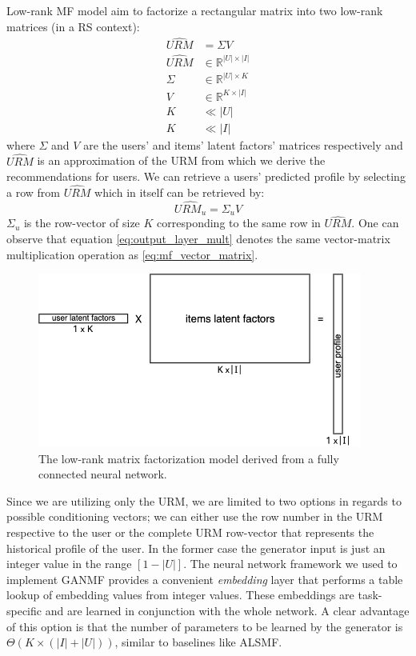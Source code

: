 Low-rank MF model aim to factorize a rectangular matrix into two low-rank matrices (in a RS context):
\[
\begin{split}
    \hat{URM} & = \Sigma V \\
    \hat{URM} & \in \mathbb{R}^{|U| \times |I|} \\
    \Sigma & \in \mathbb{R}^{|U| \times K} \\
    V & \in \mathbb{R}^{K \times |I|} \\
    K & \ll |U| \\
    K & \ll |I|
\end{split}
\]
where $\Sigma$ and $V$ are the users' and items' latent factors' matrices respectively and $\hat{URM}$ is an approximation of the URM from which we derive the recommendations for users. We can retrieve a users' predicted profile by selecting a row from $\hat{URM}$ which in itself can be retrieved by:
\begin{equation}
    \hat{URM_{u}} = \Sigma_{u}V
    \label{eq:mf_vector_matrix}
\end{equation}
$\Sigma_{u}$ is the row-vector of size $K$ corresponding to the same row in $\hat{URM}$. One can observe that equation \ref{eq:output_layer_mult} denotes the same vector-matrix multiplication operation as \ref{eq:mf_vector_matrix}.

\begin{figure}[h!]
    \centering
    \includegraphics[width=0.95\textwidth]{model/vector-matrix.png}
    \caption{The low-rank matrix factorization model derived from a fully connected neural network.}
    \label{fig:vector_matrix}
\end{figure}

Since we are utilizing only the URM, we are limited to two options in regards to possible conditioning vectors; we can either use the row number in the URM respective to the user or the complete URM row-vector that represents the historical profile of the user. In the former case the generator input is just an integer value in the range $[1-|U|]$. The neural network framework we used to implement GANMF provides a convenient \emph{embedding} layer that performs a table lookup of embedding values from integer values. These embeddings are task-specific and are learned in conjunction with the whole network. A clear advantage of this option is that the number of parameters to be learned by the generator is $\Theta(K\times(|I|+|U|))$, similar to baselines like ALSMF. 


